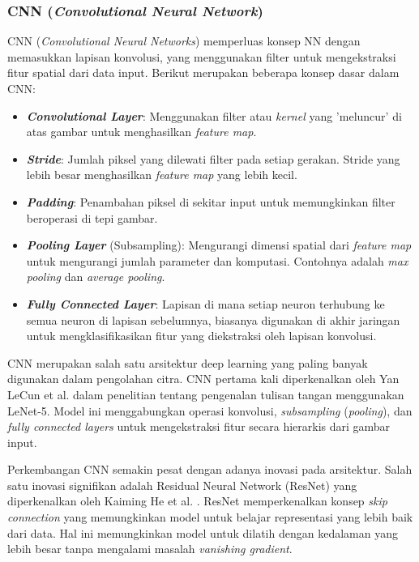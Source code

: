  \subsubsection{CNN (\emph{Convolutional Neural Network})}
 CNN (\emph{Convolutional Neural Networks}) memperluas konsep NN dengan memasukkan lapisan konvolusi, yang menggunakan filter untuk mengekstraksi fitur spatial dari data input. Berikut merupakan beberapa konsep dasar dalam CNN:
 \begin{itemize}
   \item \textbf{\emph{Convolutional Layer}}: Menggunakan filter atau \emph{kernel} yang 'meluncur' di atas gambar untuk menghasilkan \emph{feature map}.
   \item \textbf{\emph{Stride}}: Jumlah piksel yang dilewati filter pada setiap gerakan. Stride yang lebih besar menghasilkan \emph{feature map} yang lebih kecil.
   \item \textbf{\emph{Padding}}: Penambahan piksel di sekitar input untuk memungkinkan filter beroperasi di tepi gambar.
   \item \textbf{\emph{Pooling Layer}} (Subsampling): Mengurangi dimensi spatial dari \emph{feature map} untuk mengurangi jumlah parameter dan komputasi. Contohnya adalah \emph{max pooling} dan \emph{average pooling}.
   \item \textbf{\emph{Fully Connected Layer}}: Lapisan di mana setiap neuron terhubung ke semua neuron di lapisan sebelumnya, biasanya digunakan di akhir jaringan untuk mengklasifikasikan fitur yang diekstraksi oleh lapisan konvolusi.
 \end{itemize} 

 CNN merupakan salah satu arsitektur deep learning yang paling banyak digunakan dalam pengolahan citra. CNN pertama kali diperkenalkan oleh Yan LeCun et al. \parencite*{yannlecun1998} dalam penelitian tentang pengenalan tulisan tangan menggunakan LeNet-5. Model ini menggabungkan operasi konvolusi, \emph{subsampling} (\emph{pooling}), dan \emph{fully connected layers} untuk mengekstraksi fitur secara hierarkis dari gambar input.
 
Perkembangan CNN semakin pesat dengan adanya inovasi pada arsitektur. Salah satu inovasi signifikan adalah Residual Neural Network (ResNet) yang diperkenalkan oleh Kaiming He et al. \parencite*{kaiminghe2015}. ResNet memperkenalkan konsep \emph{skip connection} yang memungkinkan model untuk belajar representasi yang lebih baik dari data. Hal ini memungkinkan model untuk dilatih dengan kedalaman yang lebih besar tanpa mengalami masalah \emph{vanishing gradient}.
 
